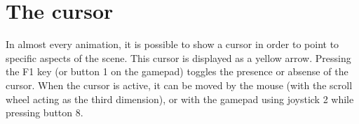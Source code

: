 \section{The cursor \label{thecursor}}
In almost every animation, it is possible to show a cursor in order to point to specific aspects of the scene. This cursor is displayed as a yellow arrow. Pressing the F1 key (or button 1 on the gamepad) toggles the presence or absense of the cursor. When the cursor is active, it can be moved by the mouse (with the scroll wheel acting as the third dimension), or with the gamepad using joystick 2 while pressing button 8.
